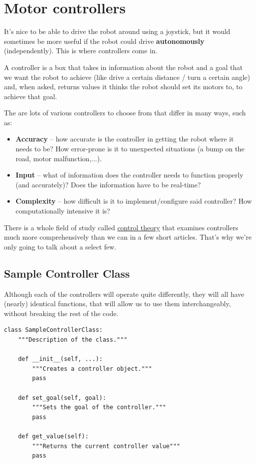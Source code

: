\documentclass[12pt,twoside]{article}
\begin{document}
\section{Motor controllers}





It's nice to be able to drive the robot around using a joystick, but it would sometimes be more useful if the robot could drive \textbf{autonomously} (independently). This is where controllers come in.

A controller is a box that takes in information about the robot and a goal that we want the robot to achieve (like drive a certain distance / turn a certain angle) and, when asked, returns values it thinks the robot should set its motors to, to achieve that goal.

The are lots of various controllers to choose from that differ in many ways, such as:
\begin{itemize}
\item \textbf{Accuracy} -- how accurate is the controller in getting the robot where it needs to be? How error-prone is it to unexpected situations (a bump on the road, motor malfunction,...).
\item \textbf{Input} -- what of information does the controller needs to function properly (and accurately)? Does the information have to be real-time?
\item \textbf{Complexity} -- how difficult is it to implement/configure said controller? How computationally intensive it is?
\end{itemize}\vspace{\parskip}

There is a whole field of study called \href{https://en.wikipedia.org/wiki/Control_theory}{control theory} that examines controllers much more comprehensively than we can in a few short articles. That's why we're only going to talk about a select few.




\subsection{Sample Controller Class}
Although each of the controllers will operate quite differently, they will all have (nearly) identical functions, that will allow us to use them interchangeably, without breaking the rest of the code.

\begin{verbatim}
class SampleControllerClass:
    """Description of the class."""

    def __init__(self, ...):
        """Creates a controller object."""
        pass

    def set_goal(self, goal):
        """Sets the goal of the controller."""
        pass

    def get_value(self):
        """Returns the current controller value"""
        pass
\end{verbatim}
\end{document}

